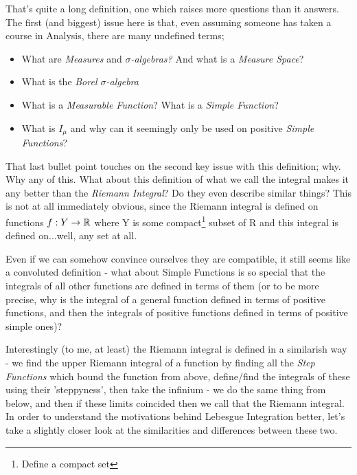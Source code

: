 That's quite a long definition, one which raises more questions than it answers. The first (and biggest) issue here is that, even assuming someone has taken a course in Analysis, there are many undefined terms;
\begin{itemize}
	\item What are {\em Measures} and {\em $\sigma$-algebras?} And what is a {\em Measure Space}?
	\item What is the {\em Borel $\sigma$-algebra}
	\item What is a {\em Measurable Function\/}? What is a {\em Simple Function}?
	\item What is $I_\mu$ and why can it seemingly only be used on positive {\em Simple Functions}?
\end{itemize}

That last bullet point touches on the second key issue with this definition; why. Why any of this. What about this definition of what we call the integral makes it any better than the {\em Riemann Integral}? Do they even describe similar things? This is not at all immediately obvious, since the Riemann integral is defined on functions $f: Y \rightarrow \mathbb{R}$ where Y is some compact\footnote{Define a compact set} subset of R and this integral is defined on...well, any set at all.

Even if we can somehow convince ourselves they are compatible, it still seems like a convoluted definition - what about Simple Functions is so special that the integrals of all other functions are defined in terms of them (or to be more precise, why is the integral of a general function defined in terms of positive functions, and then the integrals of positive functions defined in terms of positive simple ones)?

Interestingly (to me, at least) the Riemann integral is defined in a similarish way - we find the upper Riemann integral of a function by finding all the {\em Step Functions} which bound the function from above, define/find the integrals of these using their 'steppyness', then take the infinium - we do the same thing from below, and then if these limits coincided then we call that the Riemann integral. In order to understand the motivations behind Lebesgue Integration better, let's take a slightly closer look at the similarities and differences between these two.
